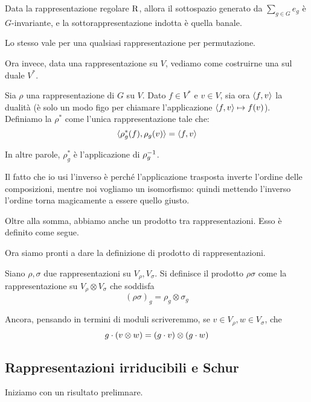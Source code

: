 	\begin{myexample}
		Data la rappresentazione regolare $\operatorname{R}$, allora il sottospazio generato da $\sum_{g\in G} e_g$ è $G$-invariante, e la sottorappresentazione indotta è quella banale.
		
		Lo stesso vale per una qualsiasi rappresentazione per permutazione.
	\end{myexample}
			
	Ora invece, data una rappresentazione su $V$, vediamo come costruirne una sul duale $V^*$.
	\begin{mydef}
		Sia $\rho$ una rappresentazione di $G$ su $V$. Dato $f\in V^*$ e $v\in V$, sia ora $\langle f , v\rangle$ la dualità (è solo un modo figo per chiamare l'applicazione $\langle f , v\rangle \mapsto f(v)$). Definiamo la  $\rho^*$ come l'unica rappresentazione tale che:
		\[
		\langle\rho^*_g(f) , \rho_g (v)\rangle=\langle f , v\rangle
		\]
	\end{mydef}

	In altre parole, $\rho^*_g$ è l'applicazione  di $\rho_g^{-1}$.

	Il fatto che io usi l'inverso è perché l'applicazione trasposta inverte l'ordine delle composizioni, mentre noi vogliamo un isomorfismo: quindi mettendo l'inverso l'ordine torna magicamente a essere quello giusto.

	Oltre alla somma, abbiamo anche un prodotto tra rappresentazioni. Esso è definito come segue. 

	Ora siamo pronti a dare la definizione di prodotto di rappresentazioni.

	\begin{mydef}
		Siano $\rho,\sigma$ due rappresentazioni su $V_\rho,V_\sigma$. Si definisce il prodotto $\rho\sigma$ come la rappresentazione su $V_\rho \otimes V_\sigma$ che soddisfa
		\[
			(\rho\sigma)_g = \rho_g \otimes \sigma_g
		\]
		
		Ancora, pensando in termini di moduli scriveremmo, se $v\in V_\rho, w\in V_\sigma$, che
		\[
		 g\cdot (v\otimes w) = (g\cdot v) \otimes (g\cdot w)
		\]

	\end{mydef}



	\subsection{Rappresentazioni irriducibili e Schur}

	Iniziamo con un risultato prelimnare.

